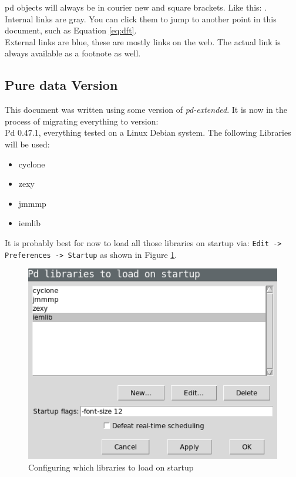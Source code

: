 
pd objects will always be in courier new and square brackets. Like this: .\\

Internal links are gray. You can click them to jump to another point in this document, such as Equation \ref{eq:dft}.\\

External links are blue, these are mostly links on the web. The actual link is always available as a footnote as well. 

\subsection{Pure data Version}
This document was written using some version of \textit{pd-extended}. It is now in the process of migrating everything to version:\\
Pd 0.47.1, everything tested on a Linux Debian system.
The following Libraries will be used:
\begin{itemize}
	\item cyclone
	\item zexy
	\item jmmmp
	\item iemlib
\end{itemize}
It is probably best for now to load all those libraries on startup via:
\texttt{Edit -> Preferences -> Startup} as shown in Figure \ref{fig:startup}.
\begin{figure}[H]
 	\centering
 	\includegraphics[width=\textwidth]{img/startup.png}
 	\caption[startup dialog]
 	{Configuring which libraries to load on startup}
 	\label{fig:startup}
 \end{figure}

